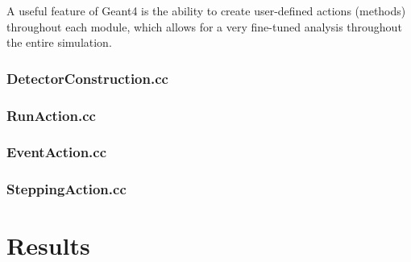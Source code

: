 \documentclass{mc2015}
\begin{document}
\noindent A useful feature of Geant4 is the ability to create user-defined actions (methods) throughout each module, which allows for a very fine-tuned analysis throughout the entire simulation.

\subsubsection{DetectorConstruction.cc}
\subsubsection{RunAction.cc}
\subsubsection{EventAction.cc}
\subsubsection{SteppingAction.cc}


\section{Results}
\end{document}

